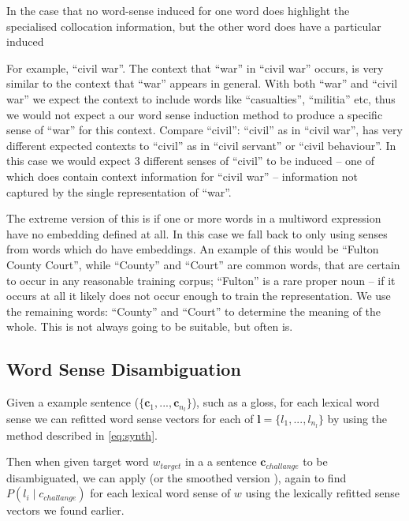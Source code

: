 \documentclass{sig-alternate}
\renewcommand{\c}{\mathbf{c}}
\renewcommand{\l}{\mathbf{l}}
\DeclareMathOperator*{\argmax}{arg\,max}
\begin{document}
In the case that no word-sense induced for one word does highlight the specialised collocation information, but the other word does have a particular induced 

For example, ``civil war''. The context that ``war'' in ``civil war'' occurs, is very similar to the context that ``war'' appears in general. With both ``war'' and ``civil war'' we expect the context to include words like ``casualties'', ``militia'' etc, thus we would not expect a our word sense induction method to produce a specific sense of ``war'' for this context.
Compare ``civil'': ``civil'' as in ``civil war'', has very different expected contexts to ``civil'' as in ``civil servant'' or ``civil behaviour''. In this case we would expect 3 different senses of ``civil'' to be induced -- one of which does contain context information for ``civil war'' -- information not captured by the single representation of ``war''.

The extreme version of this is if one or more words in a multiword expression have no embedding defined at all. In this case we fall back to only using senses from words which do have embeddings. An example of this would be ``Fulton County Court'', while ``County'' and ``Court'' are common words, that are certain to occur in any reasonable training corpus; ``Fulton'' is a rare proper noun -- if it occurs at all it likely does not occur enough to train the representation. We use the remaining words: ``County'' and ``Court'' to determine the meaning of the whole. This is not always going to be suitable, but often is.

\subsection{Word Sense Disambiguation} \label{lexicalWSD}
Given a example sentence ($\{\c_1,...,\c_{n_l}\}$), such as a gloss, for each lexical word sense we can refitted word sense vectors for each of $\l=\{l_1,..., l_{n_l}\}$ by using the method described in \cref{eq:synth}. 

Then when given target word $w_{target}$ in a a sentence $\c_{challange}$ to be disambiguated, we can apply  (or the smoothed version ), again to find $P(l_i \mid c_{challange})$ for each lexical word sense of $w$ using the lexically refitted sense vectors we found earlier.

\end{document}
